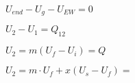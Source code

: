 \( U_{end} - U_{g} - U_{EW} = 0 \)  

\( U_{2} - U_{1} = Q_{12} \)  

\( U_{2} = m(U_{f} - U_{i}) = Q \)  

\( U_{2} = m \cdot U_{f} + x(U_{s} - U_{f}) = \)